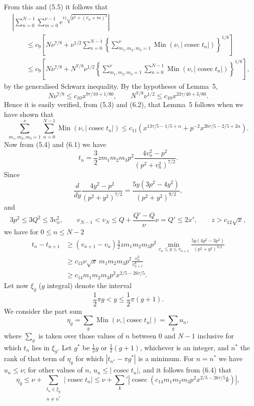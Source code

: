 \documentclass[11pt]{article}
\newcommand{\cosec}{\operatorname{cosec}}
\newcommand{\Min}{\operatorname{Min}}
\begin{document}
From this and (5.5) it follows that
\begin{align*}
&\left|\sum_{n=0}^{N-1}\sum_{m=0}^{\nu-1}
 e^{iz\sqrt{p^2+(v_n+m)^2}}\right| \\
&\qquad\leq c_9\left[N\nu^{7/8}+\nu^{1/2}\sum_{n=0}^{N-1}
 \left\{\sum_{m_1,m_2,m_3=1}^{\nu}
 \Min\left(\nu,|\cosec t_n|\right)\right\}^{1/8}\right] \\
&\qquad\leq c_9\left[N\nu^{7/8}+N^{7/8}\nu^{1/2}
 \left\{\sum_{m_1,m_2,m_3=1}^{\nu}\sum_{n=0}^{N-1}
 \Min\left(\nu,|\cosec t_n|\right)\right\}^{1/8}\right],
\tag{6.2}
\end{align*}
by the generalised Schwarz inequality. By the hypotheses of Lemma~5,
\[
 N\nu^{7/8}\leq c_{10}x^{9\tau/10+1/80},\qquad
 N^{7/8}\nu^{1/2}\leq c_{10}x^{23\tau/40+3/80}.
\]
Hence it is easily verified, from (5.3) and (6.2), that Lemma~5 follows when
we have shown that
\begin{equation}
 \sum_{m_1,m_2,m_3=1}^{\nu}\sum_{n=0}^{N-1}
 \Min\left(\nu,|\cosec t_n|\right)
 \leq c_{11}\left(x^{13\tau/5-1/5+\alpha}
 +p^{-2}x^{26\tau/5-2/5+2\alpha}\right).
 \tag{6.3}
\end{equation}
Now from (5.4) and (6.1) we have
\[
 t_n=\frac32zm_1m_2m_3p^2
 \frac{4v_n^2-p^2}{(p^2+v_n^2)^{7/2}}.
\]
Since
\[
 \frac{d}{dy}\frac{4y^2-p^2}{(p^2+y^2)^{7/2}}
 =\frac{5y(3p^2-4y^2)}{(p^2+y^2)^{9/2}},
\]
and
\[
 3p^2\leq3Q^2\leq3v_n^2,\qquad
 v_{N-1}<v_N\leq Q+\frac{Q'-Q}{\nu}\nu=Q'\leq2x^\tau,
 \qquad z>c_{12}\sqrt{x},
\]
we have for $0\leq n\leq N-2$
\begin{align*}
 t_n-t_{n+1}
 &\geq(v_{n+1}-v_n)\frac32zm_1m_2m_3p^2
 \min_{v_n\leq y\leq v_{n+1}}
 \frac{5y(4y^2-3p^2)}{(p^2+y^2)^{9/2}} \\
 &\geq c_{13}\nu\sqrt{x}\,m_1m_2m_3p^2
 \frac{v_n^3}{v_{n+1}^9} \\
 &\geq c_{14}m_1m_2m_3p^2x^{2/5-26\tau/5}.
\tag{6.4}
\end{align*}
Let now $\xi_g$ ($g$ integral) denote the interval
\[
 \frac12\pi g<y\leq\frac12\pi(g+1).
\]
We consider the part sum
\[
 \eta_g=\sum_g\Min\left(\nu,|\cosec t_n|\right)=\sum_g u_n,
\]
where $\sum_g$ is taken over those values of $n$ between $0$ and $N-1$
inclusive for which $t_n$ lies in $\xi_g$. Let $g^*$ be $\frac12g$ or
$\frac12(g+1)$, whichever is an integer, and $n^*$ the rank of that term of
$\eta_g$ for which $|t_{n^*}-\pi g^*|$ is a minimum. For $n=n^*$ we have
$u_n\leq\nu$; for other values of $n$, $u_n\leq|\cosec t_n|$, and it follows
from (6.4) that
\begin{equation}
 \eta_g\leq\nu+\sum_{\substack{t_n\in\xi_g\\n\neq n^*}}|\cosec t_n|
 \leq\nu+\sum_k'\left|\cosec\!\left(
 c_{14}m_1m_2m_3p^2x^{2/5-26\tau/5}k\right)\right|,
 \tag{6.5}
\end{equation}
\end{document}
